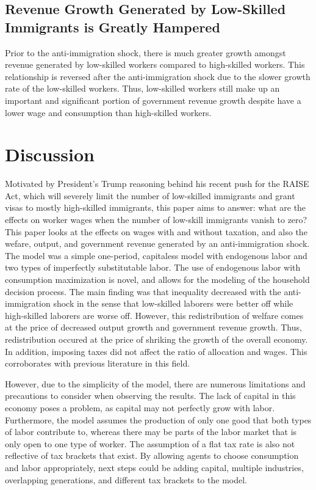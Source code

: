 \documentclass[11pt]{article}
\begin{document}
\subsection{Revenue Growth Generated by Low-Skilled Immigrants is Greatly Hampered}
Prior to the anti-immigration shock, there is much greater growth amongst revenue generated by low-skilled workers compared to high-skilled workers. This relationship is reversed after the anti-immigration shock due to the slower growth rate of the low-skilled workers. Thus, low-skilled workers still make up an important and significant portion of government revenue growth despite have a lower wage and consumption than high-skilled workers.

\section{Discussion}
Motivated by President's Trump reasoning behind his recent push for the RAISE Act, which will severely limit the number of low-skilled immigrants and grant visas to mostly high-skilled immigrants, this paper aims to answer: what are the effects on worker wages when the number of low-skill immigrants vanish to zero? This paper looks at the effects on wages with and without taxation, and also the wefare, output, and government revenue generated by an anti-immigration shock. The model was a simple one-period, capitaless model with endogenous labor and two types of imperfectly substitutable labor. The use of endogenous labor with consumption maximization is novel, and allows for the modeling of the household decision process. The main finding was that inequality decreased with the anti-immigration shock in the sense that low-skilled laborers were better off while high-skilled laborers are worse off. However, this redistribution of welfare comes at the price of decreased output growth and government revenue growth. Thus, redistribution occured at the price of shriking the growth of the overall economy. In addition, imposing taxes did not affect the ratio of allocation and wages. This corroborates with previous literature in this field.

However, due to the simplicity of the model, there are numerous limitations and precautions to consider when observing the results. The lack of capital in this economy poses a problem, as capital may not perfectly grow with labor. Furthermore, the model assumes the production of only one good that both types of labor contribute to, whereas there may be parts of the labor market that is only open to one type of worker. The assumption of a flat tax rate is also not reflective of tax brackets that exist. By allowing agents to choose consumption and labor appropriately, next steps could be adding capital, multiple industries, overlapping generations, and different tax brackets to the model.
\end{document}
